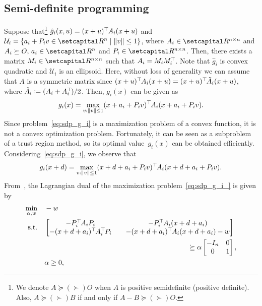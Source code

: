 \documentclass[../../main]{subfiles}
\begin{document}
\subsection{Semi-definite programming} \label{sec:pgm:robust:SDP}
Suppose that\footnote{We denote $A \succeq (\succ) O$ when $A$ is positive semidefinite (positive definite). Also, $A \succeq (\succ) B$ if and only if $A - B \succeq (\succ) O$.} $\hat{g}_i (x,u) = (x + u)^\top\hspace{-1pt} A_i (x + u)$ and ${\mathcal{U}}_i = \{ a_i + P_i v \in \setR^n \mid \| v \| \leq 1 \}$, where $A_i \in \setR^{n \times n}$ and $A_i \succeq O,\, a_i \in \setR^n$ and $P_i \in \setR^{n \times n}$. Then, there exists a matrix $M_i \in \setR^{n \times n}$ such that $A_i = M_i M_i^\top\hspace{-1pt}$. Note that $\hat{g}_i$ is convex quadratic and $\mathcal{U}_i$ is an ellipsoid. Here, without loss of generality we can assume that $A$ is a symmetric matrix since $(x + u)^\top\hspace{-1pt} A_i (x + u) = (x + u)^\top\hspace{-1pt} \tilde{A}_i (x + u)$, where $\tilde{A}_i \coloneqq (A_i+A_i^\top\hspace{-1pt}) / 2$. Then, $g_i(x)$ can be given as
\begin{equation} \label{eq:sdp_g_i}
g_i(x) = \max_{v : \| v \| \leq 1} (x + a_i + P_i v)^\top\hspace{-1pt} A_i (x + a_i + P_i v).
\end{equation}
Since problem~\cref{eq:sdp_g_i} is a maximization problem of a convex function, it is not a convex optimization problem. Fortunately, it can be seen as a subproblem of a trust region method, so its optimal value~$g_i(x)$ can be obtained efficiently. Considering~\cref{eq:sdp_g_i}, we observe that
\begin{equation} \label{eq:sdp_g_i_}
g_i(x + d) = \max_{v : \| v \| \leq 1} (x + d + a_i + P_i v)^\top\hspace{-1pt} A_i (x + d + a_i + P_i v).
\end{equation}
From~\cite[Section~3]{Beck2006}, the Lagrangian dual of the maximization problem~\cref{eq:sdp_g_i_} is given by
\begin{align}
\begin{aligned} \label{eq:dual}
\min_{\alpha, w} \quad   & -w \\ 
\st    \quad   & 
\begin{bmatrix}
-P_i^\T A_i P_i &\quad -P_i^\T A_i (x + d + a_i) \\
-(x + d + a_i)^\T A_i^\T P_i &\quad -(x + d + a_i)^\T A_i (x + d + a_i) - w
\end{bmatrix} \\
& \hspace{20.3em} \succeq
\alpha \begin{bmatrix}
-I_n & 0 \\
0 & 1
\end{bmatrix}, \\
& \alpha \geq 0,
\end{aligned}
\end{align}
\end{document}
